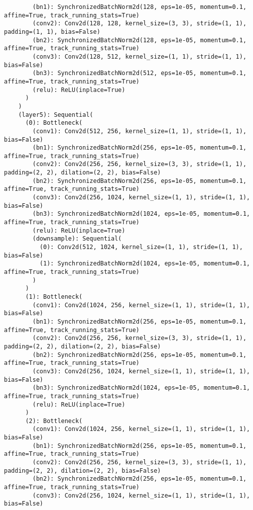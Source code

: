 \begin{verbatim}
        (bn1): SynchronizedBatchNorm2d(128, eps=1e-05, momentum=0.1, affine=True, track_running_stats=True)
        (conv2): Conv2d(128, 128, kernel_size=(3, 3), stride=(1, 1), padding=(1, 1), bias=False)
        (bn2): SynchronizedBatchNorm2d(128, eps=1e-05, momentum=0.1, affine=True, track_running_stats=True)
        (conv3): Conv2d(128, 512, kernel_size=(1, 1), stride=(1, 1), bias=False)
        (bn3): SynchronizedBatchNorm2d(512, eps=1e-05, momentum=0.1, affine=True, track_running_stats=True)
        (relu): ReLU(inplace=True)
      )
    )
    (layer5): Sequential(
      (0): Bottleneck(
        (conv1): Conv2d(512, 256, kernel_size=(1, 1), stride=(1, 1), bias=False)
        (bn1): SynchronizedBatchNorm2d(256, eps=1e-05, momentum=0.1, affine=True, track_running_stats=True)
        (conv2): Conv2d(256, 256, kernel_size=(3, 3), stride=(1, 1), padding=(2, 2), dilation=(2, 2), bias=False)
        (bn2): SynchronizedBatchNorm2d(256, eps=1e-05, momentum=0.1, affine=True, track_running_stats=True)
        (conv3): Conv2d(256, 1024, kernel_size=(1, 1), stride=(1, 1), bias=False)
        (bn3): SynchronizedBatchNorm2d(1024, eps=1e-05, momentum=0.1, affine=True, track_running_stats=True)
        (relu): ReLU(inplace=True)
        (downsample): Sequential(
          (0): Conv2d(512, 1024, kernel_size=(1, 1), stride=(1, 1), bias=False)
          (1): SynchronizedBatchNorm2d(1024, eps=1e-05, momentum=0.1, affine=True, track_running_stats=True)
        )
      )
      (1): Bottleneck(
        (conv1): Conv2d(1024, 256, kernel_size=(1, 1), stride=(1, 1), bias=False)
        (bn1): SynchronizedBatchNorm2d(256, eps=1e-05, momentum=0.1, affine=True, track_running_stats=True)
        (conv2): Conv2d(256, 256, kernel_size=(3, 3), stride=(1, 1), padding=(2, 2), dilation=(2, 2), bias=False)
        (bn2): SynchronizedBatchNorm2d(256, eps=1e-05, momentum=0.1, affine=True, track_running_stats=True)
        (conv3): Conv2d(256, 1024, kernel_size=(1, 1), stride=(1, 1), bias=False)
        (bn3): SynchronizedBatchNorm2d(1024, eps=1e-05, momentum=0.1, affine=True, track_running_stats=True)
        (relu): ReLU(inplace=True)
      )
      (2): Bottleneck(
        (conv1): Conv2d(1024, 256, kernel_size=(1, 1), stride=(1, 1), bias=False)
        (bn1): SynchronizedBatchNorm2d(256, eps=1e-05, momentum=0.1, affine=True, track_running_stats=True)
        (conv2): Conv2d(256, 256, kernel_size=(3, 3), stride=(1, 1), padding=(2, 2), dilation=(2, 2), bias=False)
        (bn2): SynchronizedBatchNorm2d(256, eps=1e-05, momentum=0.1, affine=True, track_running_stats=True)
        (conv3): Conv2d(256, 1024, kernel_size=(1, 1), stride=(1, 1), bias=False)

\end{verbatim}
